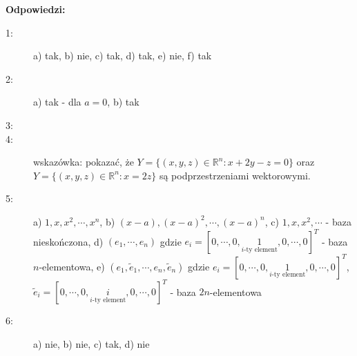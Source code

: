 \documentclass{article}
\begin{document}
\newpage
\textbf{Odpowiedzi:}
\begin{description}
    \item [1:] a) tak, b) nie, c) tak, d) tak, e) nie, f) tak
    \item [2:] a) tak - dla $a = 0$, b) tak
    \item [3:]
    \item [4:] wskazówka: pokazać, że $Y = \{ (x, y, z) \in \mathbb{R}^{n}: x + 2y -z = 0 \}$ oraz $Y = \{ (x, y, z) \in \mathbb{R}^{n}: x = 2z \}$ są podprzestrzeniami wektorowymi.
    \item [5:] a) $1, x, x^{2}, \cdots , x^{n}$, b) $(x-a), (x-a)^{2}, \cdots, (x-a)^{n}$, c) $1, x, x^{2}, \cdots $ - baza nieskończona, d) $(e_{1}, \cdots, e_{n})$ gdzie $e_{i} = [ 0, \cdots, 0, \underset{i\text{-ty element}}{1}, 0, \cdots, 0 ]^{T}$ - baza $n$-elementowa, e) $(e_{1}, \tilde{e}_{1},\cdots, e_{n}, \tilde{e}_{n})$ gdzie $e_{i} = [ 0, \cdots, 0, \underset{i\text{-ty element}}{1}, 0, \cdots, 0 ]^{T}$, $\tilde{e}_{i} = [ 0, \cdots, 0, \underset{i\text{-ty element}}{i}, 0, \cdots, 0 ]^{T}$ - baza $2n$-elementowa
    \item [6:] a) nie, b) nie, c) tak, d) nie
\end{description}
\end{document}
